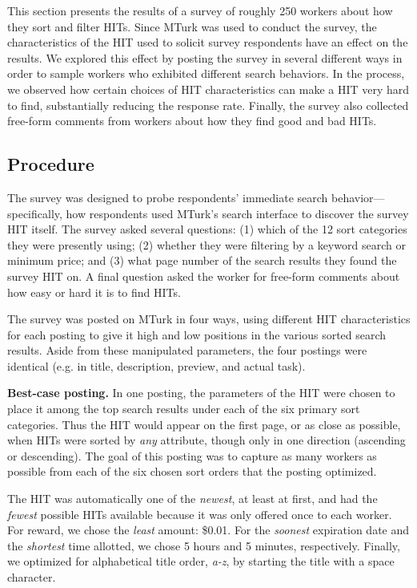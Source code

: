 \documentclass{sig-alternate}
\begin{document}
This section presents the results of a survey of roughly 250 workers
about how they sort and filter HITs. Since MTurk was used to
conduct the survey, the characteristics of the HIT used to solicit
survey respondents have an effect on the results.  We explored this
effect by posting the survey in several different ways in order to
sample workers who exhibited different search behaviors.  In the process,
we observed how certain choices of HIT characteristics can make a HIT
very hard to find, substantially reducing the response rate.  Finally,
the survey also collected free-form comments from workers about how
they find good and bad HITs.

\subsection{Procedure}
The survey was designed to probe respondents' immediate search
behavior---specifically, how respondents used MTurk's search interface
to discover the survey HIT itself.  The survey asked several
questions: (1) which of the 12 sort categories they were presently
using; (2) whether they were filtering by a keyword search or minimum
price; and (3) what page number of the search results they found the
survey HIT on.  A final question asked the worker for free-form
comments about how easy or hard it is to find HITs.

The survey was posted on MTurk in four ways, using different HIT
characteristics for each posting to give it high and low positions in
the various sorted search results.  Aside from these manipulated
parameters, the four postings were identical (e.g. in title,
description, preview, and actual task).

{\bf Best-case posting.} In one posting, the parameters of the HIT were chosen to place it among the top search results under each of the six primary sort categories.  Thus
the HIT would appear on the first page, or as close as possible, when
HITs were sorted by {\em any} attribute, though only in one
direction (ascending or descending).  The goal of this posting was to capture as many
workers as possible from each of the six chosen sort orders that the
posting optimized.

The HIT was automatically one of the {\em newest}, at least at first,
and had the {\em fewest} possible HITs available because it was only
offered once to each worker.  For reward, we chose the {\em least}
amount: \$0.01.  For the {\em soonest} expiration date and the {\em
  shortest} time allotted, we chose 5 hours and 5 minutes,
respectively. Finally, we optimized for alphabetical title order, {\em
  a-z}, by starting the title with a space character.
\end{document}
